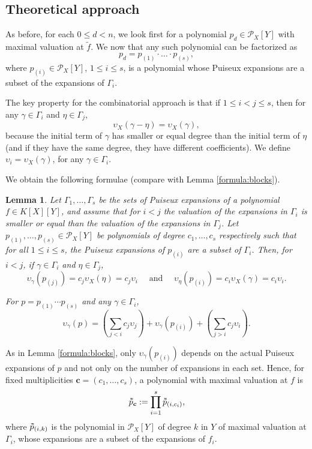 \documentclass[a4paper,11pt]{amsart}%
\theoremstyle{definition}
\theoremstyle{plain}
\newtheorem{lemma}[defn]{Lemma}
\theoremstyle{remark}
\newcommand{\Px}{{\mathcal{P}_X}}
\newcommand{\vardbtilde}[1]{\tilde{\raisebox{0pt}[0.85\height]{$\tilde{#1}$}}}
\begin{document}
\subsection{Theoretical approach}
As before, for each $0 \le d < n$, we look first for a polynomial $p_d \in \Px[Y]$ with maximal valuation at $\tilde f$. We now that any such polynomial can be factorized as
$$
p_d = p_{(1)} \cdot \dots \cdot p_{(s)},
$$
where $p_{(i)} \in \Px[Y]$, $1 \le i \le s$, is a polynomial whose Puiseux expansions are a subset of the expansions of $\Gamma_i$.

The key
property for the combinatorial approach is that if $1 \leq i < j \leq s$, then for any $\gamma \in\Gamma_{i}$ and $\eta \in \Gamma_{j}$,
$$\upsilon_X(\gamma - \eta) = \upsilon_X(\gamma),$$
because the initial term of $\gamma$ has smaller or equal degree than the initial term of $\eta$ (and if they have the same degree, they have different coefficients). We define $\upsilon_i = \upsilon_X(\gamma)$, for any $\gamma \in \Gamma_i$.

We obtain the following formulae (compare with Lemma \ref{formula:blocks}).
\begin{lemma}
\label{formula:sets}
Let $\Gamma_1, \dots, \Gamma_s$ be the sets of Puiseux expansions of a polynomial $f \in K[X][Y]$, and assume that for $i < j$ the valuation of the expansions in $\Gamma_i$ is smaller or equal than the valuation of the expansions in $\Gamma_j$. Let $p_{(1)}, \dots, p_{(s)} \in \mathcal{P}_{X}[Y]$ be polynomials of degree $c_1, \dots, c_s$ respectively such that for all $1 \le i \le s$, the Puiseux expansions of $p_{(i)}$ are a subset of $\Gamma_i$. Then, for $i < j$, if $\gamma \in \Gamma_i$ and $\eta \in \Gamma_j$,
$$
\upsilon_{\gamma}(p_{(j)}) = c_j \upsilon_X(\eta) = c_j \upsilon_i \quad \text{ and } \quad \upsilon_{\eta}(p_{(i)}) = c_i \upsilon_X(\gamma) = c_i \upsilon_i.
$$

For $p = p_{(1)} \cdots p_{(s)}$ and any $\gamma \in \Gamma_i$,
\[
\boxed{
\upsilon_{\gamma}(p) = \left(\textstyle \sum_{j < i} c_j \upsilon_j\right) + \upsilon_{\gamma}(p_{(i)}) + \left(\textstyle  \sum_{j > i} c_j \upsilon_i \right).}
\]
\end{lemma}

As in Lemma \ref{formula:blocks}, only $\upsilon_{\gamma}(p_{(i)})$ depends on the actual Puiseux expansions of $p$ and not only on the number of expansions in each set. Hence, for fixed multiplicities $\bm{c} = (c_1, \dots, c_s)$, a polynomial with
maximal valuation at $f$ is
$$\vardbtilde p_{\bm c} := \prod_{i = 1}^s \vardbtilde p_{(i, c_i)},$$
where $\vardbtilde p_{(i, k)}$ is the polynomial in $\mathcal{P}_{X}[Y]$ of degree $k$ in $Y$ of maximal valuation at $\Gamma_i$, whose expansions are a subset of the expansions of $f_i$.
\end{document}
